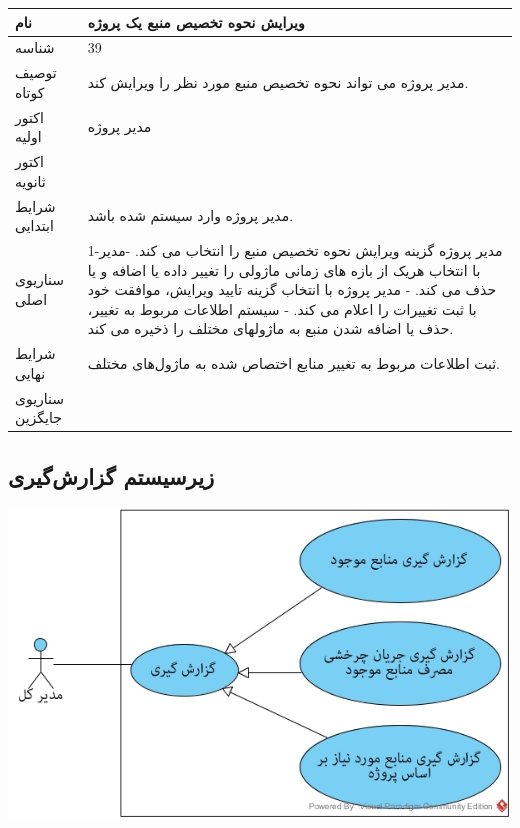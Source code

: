 \vspace{2cm}

\begin{tabular}{|p{2cm}|p{10cm}|}
\hline
نام
&
ویرایش نحوه تخصیص منبع یک پروژه
\\
\hline
شناسه
&
39
\\
\hline
توصیف کوتاه
&
مدیر پروژه می تواند نحوه تخصیص منبع مورد نظر را ویرایش کند. 
\\
\hline
اکتور اولیه
&
مدیر پروژه
\\
\hline
اکتور ثانویه
&

\\
\hline
شرایط ابتدایی
&
مدیر پروژه وارد سیستم شده باشد.
\\
\hline
سناریوی اصلی
&
1-مدیر پروژه گزینه ویرایش نحوه تخصیص منبع را انتخاب می کند.
\newline
2-مدیر با انتخاب هریک از بازه های زمانی ماژولی را تغییر داده یا اضافه و یا حذف می کند.
\newline
3- مدیر پروژه با انتخاب گزینه تایید ویرایش، موافقت خود با ثبت تغییرات را اعلام می کند.
\newline
4- سیستم اطلاعات مربوط به تغییر، حذف یا اضافه شدن منبع به ماژولهای مختلف را ذخیره می کند.  
\\
\hline
شرایط نهایی
&
ثبت اطلاعات مربوط به تغییر منابع اختصاص شده به ماژول‌های مختلف.
\\
\hline
سناریوی جایگزین
&

\\
\hline
\end{tabular}


\newpage
\subsection{زیرسیستم گزارش‌گیری}

\vspace{2cm}
\begin{center}
\includegraphics[width=\textwidth]{Diagrams/Reporting.jpg}
\end{center}

